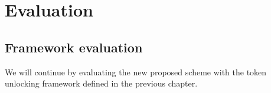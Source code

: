 
\chapter{Evaluation} %

\label{Chapter6} %


\section{Framework evaluation}
We will continue by evaluating the new proposed scheme with the token unlocking framework defined in the previous chapter. 

